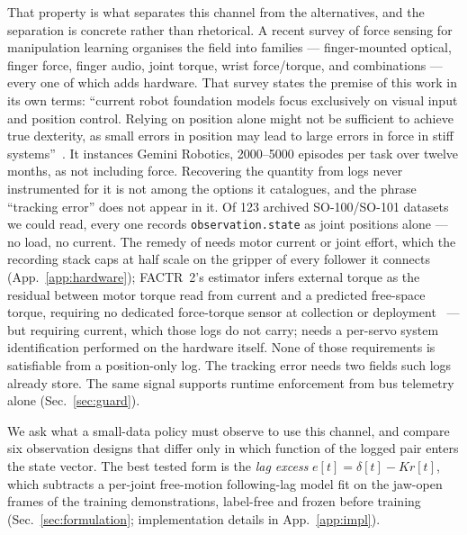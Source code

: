 \documentclass{article}
\begin{document}
That property is what separates this channel from the alternatives, and
the separation is concrete rather than rhetorical. A recent survey of
force sensing for manipulation learning organises the field into families
--- finger-mounted optical, finger force, finger audio, joint torque,
wrist force/torque, and combinations --- every one of which adds
hardware. That survey states the premise of this work in its own terms:
``current robot foundation models focus exclusively on visual input and
position control. Relying on position alone might not be sufficient to
achieve true dexterity, as small errors in position may lead to large
errors in force in stiff systems''~\citep{xie2025forceful}. It instances
Gemini Robotics, 2000--5000 episodes per task over twelve months, as not
including force. Recovering the quantity from logs never instrumented for
it is not among the options it catalogues, and the phrase ``tracking
error'' does not appear in it. Of 123 archived
SO-100/SO-101 datasets we could read, every one records
\texttt{observation.state} as joint positions alone --- no load, no
current. The remedy of \citet{wong2026beyond} needs motor current or
joint effort, which the recording stack caps at half scale on the gripper
of every follower it connects (App.~\ref{app:hardware}); FACTR~2's estimator
infers external torque as the residual between motor torque read from
current and a predicted free-space torque, requiring no dedicated
force-torque sensor at collection or deployment~\citep{oh2026factr2} ---
but requiring current, which those logs do not carry;
\citet{hwang2018virtual} needs a per-servo system identification
performed on the hardware itself. None of those requirements is
satisfiable from a position-only log. The tracking error needs two fields
such logs already store.
The same signal supports runtime enforcement from bus telemetry alone
(Sec.~\ref{sec:guard}).

We ask what a small-data policy must observe to use this channel, and
compare six observation designs that differ only in which function of the
logged pair enters the state vector. The best tested form is the
\emph{lag excess} $e[t] = \delta[t] - \hat{K} r[t]$, which subtracts a
per-joint free-motion following-lag model fit on the jaw-open frames of
the training demonstrations, label-free and frozen before training
(Sec.~\ref{sec:formulation}; implementation details in
App.~\ref{app:impl}).
\end{document}
